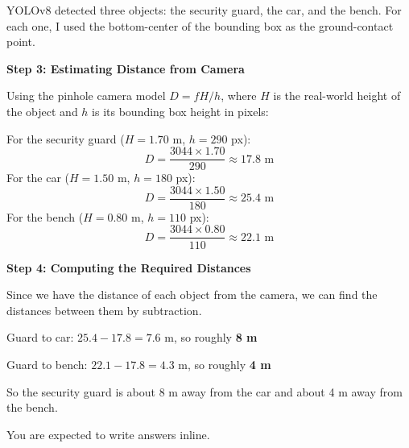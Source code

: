 \documentclass[12pt,a4paper]{article}
\newenvironment{studentSpace}{\par\medskip\noindent}{\par\bigskip}
\begin{document}
\begin{enumerate}
\begin{studentSpace}
YOLOv8 detected three objects: the security guard, the car, and the bench. For each one, I used the bottom-center of the bounding box as the ground-contact point.

\textbf{Step 3: Estimating Distance from Camera}

Using the pinhole camera model $D = fH/h$, where $H$ is the real-world height of the object and $h$ is its bounding box height in pixels:

For the security guard ($H = 1.70$ m, $h = 290$ px):
\[
D = \frac{3044 \times 1.70}{290} \approx 17.8 \text{ m}
\]
For the car ($H = 1.50$ m, $h = 180$ px):
\[
D = \frac{3044 \times 1.50}{180} \approx 25.4 \text{ m}
\]
For the bench ($H = 0.80$ m, $h = 110$ px):
\[
D = \frac{3044 \times 0.80}{110} \approx 22.1 \text{ m}
\]

\textbf{Step 4: Computing the Required Distances}

Since we have the distance of each object from the camera, we can find the distances between them by subtraction.

Guard to car: $25.4 - 17.8 = 7.6$ m, so roughly \textbf{8 m}

Guard to bench: $22.1 - 17.8 = 4.3$ m, so roughly \textbf{4 m}

So the security guard is about 8 m away from the car and about 4 m away from the bench.
\end{studentSpace}

\end{enumerate}

You are expected to write answers inline.
\end{document}
